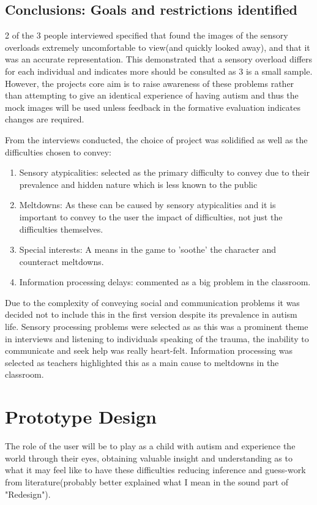 \documentclass[11pt]{report}
\begin{document}
\section{Conclusions: Goals and restrictions identified}

2 of the 3 people interviewed specified that found the images of the sensory overloads extremely uncomfortable to view(and quickly looked away), and that it was an accurate representation. This demonstrated that a sensory overload differs for each individual and indicates more should be consulted as 3 is a small sample. However, the projects core aim is to raise awareness of these problems rather than attempting to give an identical experience of having autism and thus the mock images will be used unless feedback in the formative evaluation indicates changes are required. 

From the interviews conducted, the choice of project was solidified as well as the difficulties chosen to convey:

\begin{enumerate}
\item Sensory atypicalities: selected as the primary difficulty to convey due to their prevalence and hidden nature which is less known to the public
\item Meltdowns: As these can be caused by sensory atypicalities and it is important to convey to the user the impact of difficulties, not just the difficulties themselves.
\item Special interests: A means in the game to 'soothe' the character and counteract meltdowns.
\item Information processing delays: commented as a big problem in the classroom.
\end{enumerate}

Due to the complexity of conveying social and communication problems it was decided not to include this in the first version despite its prevalence in autism life. Sensory processing problems were selected as as this was a prominent theme in interviews and listening to individuals speaking of the trauma, the inability to communicate and seek help was really heart-felt. Information processing was selected as teachers highlighted this as a main cause to meltdowns in the classroom. 


\chapter{Prototype Design}
The role of the user will be to play as a child with autism and experience the world through their eyes, obtaining valuable insight and understanding as to what it may feel like to have these difficulties reducing inference and guess-work from literature(probably better explained what I mean in the sound part of "Redesign").
\end{document}
